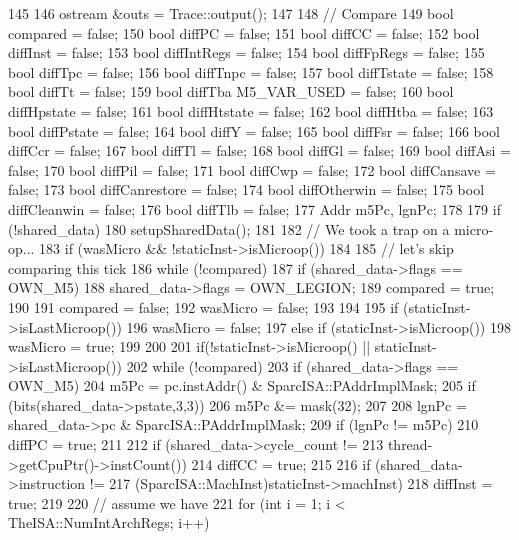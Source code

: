 \begin{DoxyCode}
145 {
146     ostream &outs = Trace::output();
147 
148     // Compare
149     bool compared = false;
150     bool diffPC   = false;
151     bool diffCC   = false;
152     bool diffInst = false;
153     bool diffIntRegs = false;
154     bool diffFpRegs = false;
155     bool diffTpc = false;
156     bool diffTnpc = false;
157     bool diffTstate = false;
158     bool diffTt = false;
159     bool diffTba M5_VAR_USED = false;
160     bool diffHpstate = false;
161     bool diffHtstate = false;
162     bool diffHtba = false;
163     bool diffPstate = false;
164     bool diffY = false;
165     bool diffFsr = false;
166     bool diffCcr = false;
167     bool diffTl = false;
168     bool diffGl = false;
169     bool diffAsi = false;
170     bool diffPil = false;
171     bool diffCwp = false;
172     bool diffCansave = false;
173     bool diffCanrestore = false;
174     bool diffOtherwin = false;
175     bool diffCleanwin = false;
176     bool diffTlb = false;
177     Addr m5Pc, lgnPc;
178 
179     if (!shared_data)
180         setupSharedData();
181 
182     // We took a trap on a micro-op...
183     if (wasMicro && !staticInst->isMicroop())
184     {
185         // let's skip comparing this tick
186         while (!compared)
187             if (shared_data->flags == OWN_M5) {
188                 shared_data->flags = OWN_LEGION;
189                 compared = true;
190             }
191         compared = false;
192         wasMicro = false;
193     }
194 
195     if (staticInst->isLastMicroop())
196         wasMicro = false;
197     else if (staticInst->isMicroop())
198         wasMicro = true;
199 
200 
201     if(!staticInst->isMicroop() || staticInst->isLastMicroop()) {
202         while (!compared) {
203             if (shared_data->flags == OWN_M5) {
204                 m5Pc = pc.instAddr() & SparcISA::PAddrImplMask;
205                 if (bits(shared_data->pstate,3,3)) {
206                     m5Pc &= mask(32);
207                 }
208                 lgnPc = shared_data->pc & SparcISA::PAddrImplMask;
209                 if (lgnPc != m5Pc)
210                    diffPC = true;
211 
212                 if (shared_data->cycle_count !=
213                         thread->getCpuPtr()->instCount())
214                     diffCC = true;
215 
216                 if (shared_data->instruction !=
217                         (SparcISA::MachInst)staticInst->machInst) {
218                     diffInst = true;
219                 }
220                 // assume we have %
221                 for (int i = 1; i < TheISA::NumIntArchRegs; i++) {
}}}}}
\end{DoxyCode}
